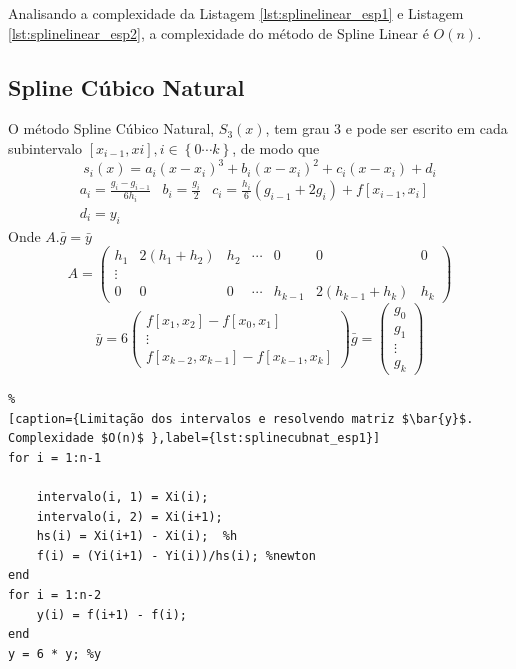 \documentclass[conference]{IEEEtran}
\begin{document}
Analisando a complexidade da Listagem \ref{lst:splinelinear_esp1} e Listagem \ref{lst:splinelinear_esp2}, a complexidade do método de Spline Linear é $O(n)$.

\subsection{Spline Cúbico Natural} \label{subsec:splinecubnat}
O método Spline Cúbico Natural, $S_{3}(x)$, tem grau $3$ e pode ser escrito em cada subintervalo $[x_{i-1}, x{i}], i \in \left \{ 0 \cdots k  \right \} $, de modo que
$$
s_{i}(x)=a_{i}(x-x_{i})^{3}+b_{i}(x-x_{i})^{2}+c_{i}(x-x_{i}) + d_{i}
$$
$$
\begin{matrix}
a_i = \frac{g_i - g_{i-1}}{6h_i} & b_i = \frac{g_i}{2} & c_i = \frac{h_i}{6}(g_{i-1}+2g_i)+f[x_{i-1}, x_i] & \\ d_i=y_i
\end{matrix}
$$
Onde
$A.\bar{g}=\bar{y}$
$$
A=\begin{pmatrix}
 h_1& 2(h_1+h_2) &h_2  &  \cdots & 0 & 0 & 0 \\ 
 \vdots  \\ 
 0& 0 & 0  & \cdots & h_{k-1} & 2(h_{k-1} + h_k)&h_k 
\end{pmatrix}
$$
$$
\bar{y} = 6\begin{pmatrix}
f[x_1,x_2] - f[x_0,x_1]
\\ \vdots 
\\f[x_{k-2},x_{k-1}] - f[x_{k-1},x_k]
\end{pmatrix} 
\bar{g} = \begin{pmatrix}
 g_0
\\ g_1
\\ \vdots 
\\g_k
\end{pmatrix}
$$

\begin{lstlisting}%
[caption={Limitação dos intervalos e resolvendo matriz $\bar{y}$. Complexidade $O(n)$ },label={lst:splinecubnat_esp1}]
for i = 1:n-1
        
    intervalo(i, 1) = Xi(i);
    intervalo(i, 2) = Xi(i+1);
    hs(i) = Xi(i+1) - Xi(i);  %h
    f(i) = (Yi(i+1) - Yi(i))/hs(i); %newton
end
for i = 1:n-2
    y(i) = f(i+1) - f(i);
end
y = 6 * y; %y
\end{lstlisting}
\end{document}
